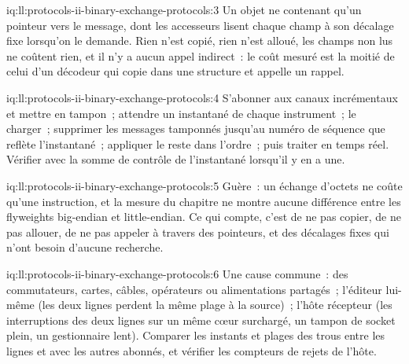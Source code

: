 \begin{solution}{iq:ll:protocols-ii-binary-exchange-protocols:3}
Un objet ne contenant qu'un pointeur vers le message, dont les accesseurs lisent chaque champ à son décalage fixe lorsqu'on le demande. Rien n'est
copié, rien n'est alloué, les champs non lus ne coûtent rien, et il n'y a aucun appel indirect~: le coût mesuré est la moitié de celui
d'un décodeur qui copie dans une structure et appelle un rappel.
\end{solution}

\begin{solution}{iq:ll:protocols-ii-binary-exchange-protocols:4}
S'abonner aux canaux incrémentaux et mettre en tampon~; attendre un instantané de chaque instrument~; le charger~; supprimer les messages tamponnés jusqu'au
numéro de séquence que reflète l'instantané~; appliquer le reste dans l'ordre~; puis traiter en temps réel. Vérifier avec la somme de contrôle de l'instantané
lorsqu'il y en a une.
\end{solution}

\begin{solution}{iq:ll:protocols-ii-binary-exchange-protocols:5}
Guère~: un échange d'octets ne coûte qu'une instruction, et la mesure du chapitre ne montre aucune différence entre les
flyweights big-endian et little-endian. Ce qui compte, c'est de ne pas copier, de ne pas allouer, de ne pas appeler à travers des pointeurs, et des décalages fixes qui n'ont besoin d'aucune recherche.
\end{solution}

\begin{solution}{iq:ll:protocols-ii-binary-exchange-protocols:6}
Une cause commune~: des commutateurs, cartes, câbles, opérateurs ou alimentations partagés~; l'éditeur lui-même (les deux lignes perdent la même plage à la
source)~; l'hôte récepteur (les interruptions des deux lignes sur un même cœur surchargé, un tampon de socket plein, un gestionnaire lent). Comparer les
instants et plages des trous entre les lignes et avec les autres abonnés, et vérifier les compteurs de rejets de l'hôte.
\end{solution}

